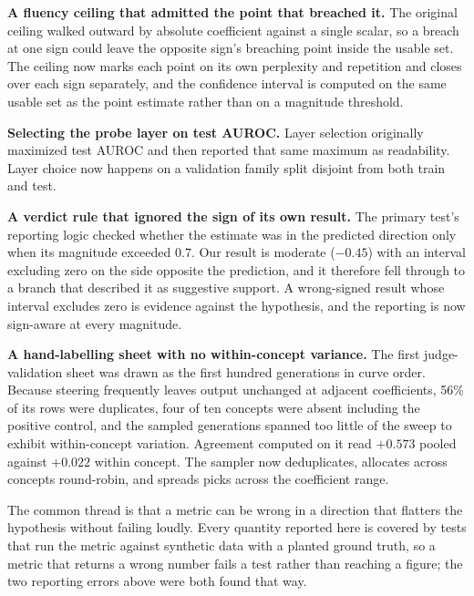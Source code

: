\documentclass{article}
\begin{document}
\textbf{A fluency ceiling that admitted the point that breached it.} The
original ceiling walked outward by absolute coefficient against a single scalar,
so a breach at one sign could leave the opposite sign's breaching point inside
the usable set. The ceiling now marks each point on its own perplexity and
repetition and closes over each sign separately, and the confidence interval is
computed on the same usable set as the point estimate rather than on a magnitude
threshold.

\textbf{Selecting the probe layer on test AUROC.} Layer selection originally
maximized test AUROC and then reported that same maximum as readability. Layer
choice now happens on a validation family split disjoint from both train and
test.

\textbf{A verdict rule that ignored the sign of its own result.} The primary
test's reporting logic checked whether the estimate was in the predicted
direction only when its magnitude exceeded $0.7$. Our result is moderate
($-0.45$) with an interval excluding zero on the side opposite the prediction,
and it therefore fell through to a branch that described it as suggestive
support. A wrong-signed result whose interval excludes zero is evidence against
the hypothesis, and the reporting is now sign-aware at every magnitude.

\textbf{A hand-labelling sheet with no within-concept variance.} The first
judge-validation sheet was drawn as the first hundred generations in curve
order. Because steering frequently leaves output unchanged at adjacent
coefficients, 56\% of its rows were duplicates, four of ten concepts were absent
including the positive control, and the sampled generations spanned too little
of the sweep to exhibit within-concept variation. Agreement computed on it read
$+0.573$ pooled against $+0.022$ within concept. The sampler now deduplicates,
allocates across concepts round-robin, and spreads picks across the coefficient
range.

The common thread is that a metric can be wrong in a direction that flatters the
hypothesis without failing loudly. Every quantity reported here is covered by
tests that run the metric against synthetic data with a planted ground truth, so
a metric that returns a wrong number fails a test rather than reaching a figure;
the two reporting errors above were both found that way.
\end{document}
